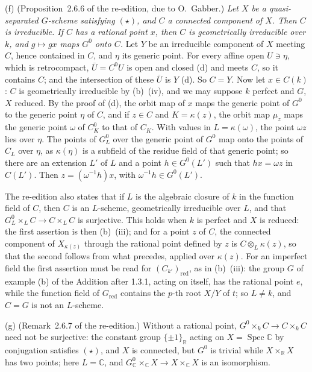 \label{prop:sga3-VIA-2.6.6}%
(f) (Proposition~2.6.6 of the re-edition, due to O.~Gabber.) \emph{Let \(X\) be a quasi-separated
\(G\)-scheme satisfying \((\star)\), and \(C\) a connected component of \(X\). Then \(C\) is
irreducible. If \(C\) has a rational point \(x\), then \(C\) is geometrically irreducible over \(k\),
and \(g\mapsto gx\) maps \(G^0\) onto \(C\).} Let \(Y\) be an irreducible component of \(X\) meeting
\(C\), hence contained in \(C\), and \(\eta\) its generic point. For every affine open \(U\ni\eta\),
which is retrocompact, \(\overline U=C^0U\) is open and closed (d) and meets \(C\), so it contains
\(C\); and the intersection of these \(\overline U\) is \(Y\) (d). So \(C=Y\). Now let
\(x\in C(k)\): \(C\) is geometrically irreducible by (b)~(iv), and we may suppose \(k\) perfect and
\(G\), \(X\) reduced. By the proof of (d), the orbit map of \(x\) maps the generic point of \(G^0\) to
the generic point \(\eta\) of \(C\), and if \(z\in C\) and \(K=\kappa(z)\), the orbit map \(\mu_z\) maps
the generic point \(\omega\) of \(C^0_K\) to that of \(C_K\). With values in \(L=\kappa(\omega)\), the
point \(\omega z\) lies over \(\eta\). The points of \(G^0_L\) over the generic point of \(G^0\) map
onto the points of \(C_L\) over \(\eta\), as \(\kappa(\eta)\) is a subfield of the residue field of
that generic point; so there are an extension \(L'\) of \(L\) and a point \(h\in G^0(L')\) such that
\(hx=\omega z\) in \(C(L')\). Then \(z=(\omega^{-1}h)x\), with \(\omega^{-1}h\in G^0(L')\).

The re-edition also states that if \(L\) is the algebraic closure of \(k\) in the function field of
\(C\), then \(C\) is an \(L\)-scheme, geometrically irreducible over \(L\), and that
\(G^0_L\times_LC\to C\times_LC\) is surjective. This holds when \(k\) is perfect and \(X\) is
reduced: the first assertion is then (b)~(iii); and for a point \(z\) of \(C\), the connected
component of \(X_{\kappa(z)}\) through the rational point defined by \(z\) is \(C\otimes_L\kappa(z)\),
so that the second follows from what precedes, applied over \(\kappa(z)\). For an imperfect field the
first assertion must be read for \((C_{k'})_{\mathrm{red}}\), as in (b)~(iii): the group \(G\) of
example (b) of the Addition after 1.3.1, acting on itself, has the rational point \(e\), while the
function field of \(G_{\mathrm{red}}\) contains the \(p\)-th root \(X/Y\) of \(t\); so \(L\neq k\), and
\(C=G\) is not an \(L\)-scheme.

(g) (Remark~2.6.7 of the re-edition.) Without a rational point, \(G^0\times_kC\to C\times_kC\) need
not be surjective: the constant group \(\{\pm1\}_{\mathbb R}\) acting on \(X=\operatorname{Spec}\mathbb C\)
by conjugation satisfies \((\star)\), and \(X\) is connected, but \(G^0\) is trivial while
\(X\times_{\mathbb R}X\) has two points; here \(L=\mathbb C\), and
\(G^0_{\mathbb C}\times_{\mathbb C}X\to X\times_{\mathbb C}X\) is an isomorphism.
